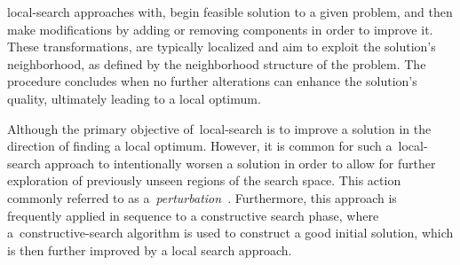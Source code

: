 \acrfull{local-search} approaches with, begin feasible solution to a given
problem, and then make modifications by adding or removing components in order
to improve it. These transformations, are typically localized and aim to exploit
the solution's neighborhood, as defined by the neighborhood structure of the
problem. The procedure concludes when no further alterations can enhance the
solution's quality, ultimately leading to a local optimum.

Although the primary objective of~\acrshort{local-search} is to improve a
solution in the direction of finding a local optimum. However, it is common for
such a~\acrshort{local-search} approach to intentionally worsen a solution in
order to allow for further exploration of previously unseen regions of the
search space. This action commonly referred to as
a~\textit{perturbation}~\cite{lourenco2010iterateda}. Furthermore, this
approach is frequently applied in sequence to a constructive search phase, where
a~\acrshort{constructive-search} algorithm is used to construct a good initial
solution, which is then further improved by a local search approach.